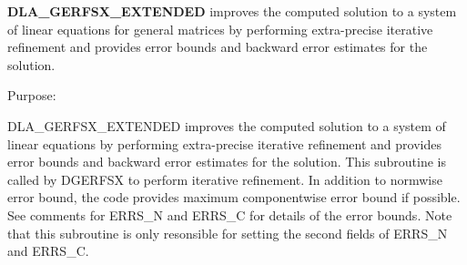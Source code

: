 {\bfseries D\+L\+A\+\_\+\+G\+E\+R\+F\+S\+X\+\_\+\+E\+X\+T\+E\+N\+D\+E\+D} improves the computed solution to a system of linear equations for general matrices by performing extra-\/precise iterative refinement and provides error bounds and backward error estimates for the solution. 

 \begin{DoxyParagraph}{Purpose\+: }
\begin{DoxyVerb} DLA_GERFSX_EXTENDED improves the computed solution to a system of
 linear equations by performing extra-precise iterative refinement
 and provides error bounds and backward error estimates for the solution.
 This subroutine is called by DGERFSX to perform iterative refinement.
 In addition to normwise error bound, the code provides maximum
 componentwise error bound if possible. See comments for ERRS_N
 and ERRS_C for details of the error bounds. Note that this
 subroutine is only resonsible for setting the second fields of
 ERRS_N and ERRS_C.\end{DoxyVerb}
 
\end{DoxyParagraph}

